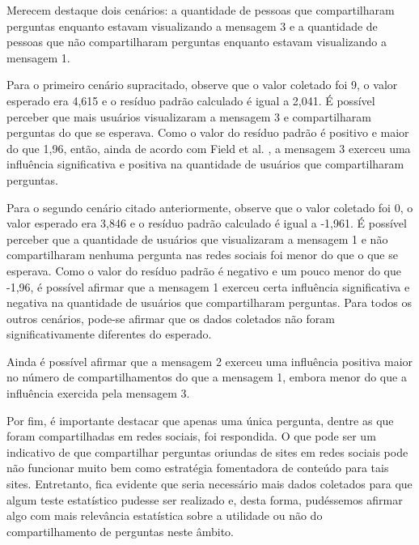 Merecem destaque dois cenários: a quantidade de pessoas que compartilharam perguntas enquanto estavam visualizando a mensagem 3 e a quantidade de pessoas que não compartilharam perguntas enquanto estavam visualizando a mensagem 1. 

Para o primeiro cenário supracitado, observe que o valor coletado foi 9, o valor esperado era 4,615 e o resíduo padrão calculado é igual a 2,041. É possível perceber que mais usuários visualizaram a mensagem 3 e compartilharam perguntas do que se esperava. Como o valor do resíduo padrão é positivo e maior do que 1,96, então, ainda de acordo com Field et al. \cite{field2012discovering}, a mensagem 3 exerceu uma influência significativa e positiva na quantidade de usuários que compartilharam perguntas.  

Para o segundo cenário citado anteriormente, observe que o valor coletado foi 0, o valor esperado era 3,846 e o resíduo padrão calculado é igual a -1,961. É possível perceber que a quantidade de usuários que visualizaram a mensagem 1 e não compartilharam nenhuma pergunta nas redes sociais foi menor do que o que se esperava. Como o valor do resíduo padrão é negativo e um pouco menor do que -1,96, é possível afirmar que a mensagem 1 exerceu certa influência significativa e negativa na quantidade de usuários que compartilharam perguntas. Para todos os outros cenários, pode-se afirmar que os dados coletados não foram significativamente diferentes do esperado. 

Ainda é possível afirmar que a mensagem 2 exerceu uma influência positiva maior no número de compartilhamentos do que a mensagem 1, embora menor do que a influência exercida pela mensagem 3.

Por fim, é importante destacar que apenas uma única pergunta, dentre as que foram compartilhadas em redes sociais, foi respondida. O que pode ser um indicativo de que compartilhar perguntas oriundas de sites \qa em redes sociais pode não funcionar muito bem como estratégia fomentadora de conteúdo para tais sites. Entretanto, fica evidente que seria necessário mais dados coletados para que algum teste estatístico pudesse ser realizado e, desta forma, pudéssemos afirmar algo com mais relevância estatística sobre a utilidade ou não do compartilhamento de perguntas neste âmbito.